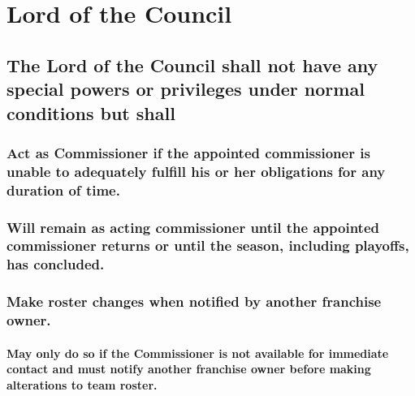 \documentclass[
]{book}
\begin{document}
\hypertarget{lord-of-the-council}{%
\section{Lord of the Council}\label{lord-of-the-council}}

\hypertarget{the-lord-of-the-council-shall-not-have-any-special-powers-or-privileges-under-normal-conditions-but-shall}{%
\subsection{The Lord of the Council shall not have any special powers or privileges under normal conditions but shall}\label{the-lord-of-the-council-shall-not-have-any-special-powers-or-privileges-under-normal-conditions-but-shall}}

\hypertarget{act-as-commissioner-if-the-appointed-commissioner-is-unable-to-adequately-fulfill-his-or-her-obligations-for-any-duration-of-time.}{%
\subsubsection{Act as Commissioner if the appointed commissioner is unable to adequately fulfill his or her obligations for any duration of time.}\label{act-as-commissioner-if-the-appointed-commissioner-is-unable-to-adequately-fulfill-his-or-her-obligations-for-any-duration-of-time.}}

\hypertarget{will-remain-as-acting-commissioner-until-the-appointed-commissioner-returns-or-until-the-season-including-playoffs-has-concluded.}{%
\subsubsection{Will remain as acting commissioner until the appointed commissioner returns or until the season, including playoffs, has concluded.}\label{will-remain-as-acting-commissioner-until-the-appointed-commissioner-returns-or-until-the-season-including-playoffs-has-concluded.}}

\hypertarget{make-roster-changes-when-notified-by-another-franchise-owner.}{%
\subsubsection{Make roster changes when notified by another franchise owner.}\label{make-roster-changes-when-notified-by-another-franchise-owner.}}

\hypertarget{may-only-do-so-if-the-commissioner-is-not-available-for-immediate-contact-and-must-notify-another-franchise-owner-before-making-alterations-to-team-roster.}{%
\paragraph{May only do so if the Commissioner is not available for immediate contact and must notify another franchise owner before making alterations to team roster.}\label{may-only-do-so-if-the-commissioner-is-not-available-for-immediate-contact-and-must-notify-another-franchise-owner-before-making-alterations-to-team-roster.}}
\end{document}
